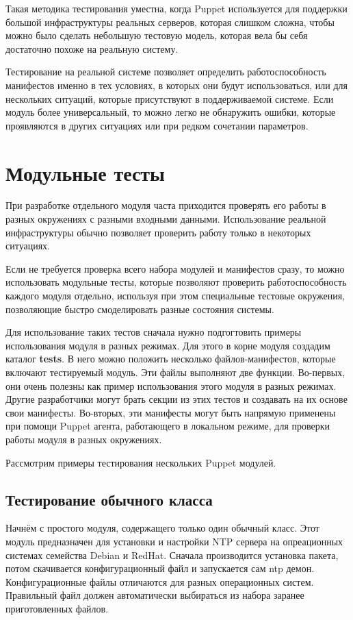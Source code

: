 Такая методика тестирования уместна, когда Puppet используется для поддержки большой инфраструктуры реальных серверов, которая слишком сложна, чтобы можно было сделать небольшую тестовую модель, которая вела бы себя достаточно похоже на реальную систему.

Тестирование на реальной системе позволяет определить работоспособность манифестов именно в тех условиях, в которых они будут использоваться, или для нескольких ситуаций, которые присутствуют в поддерживаемой системе. Если модуль более универсальный, то можно легко не обнаружить ошибки, которые проявляются в других ситуациях или при редком сочетании параметров.

\section{Модульные тесты}

При разработке отдельного модуля часта приходится проверять его работы в разных окружениях с разными входными данными. Использование реальной инфраструктуры обычно позволяет проверить работу только в некоторых ситуациях.

Если не требуется проверка всего набора модулей и манифестов сразу, то можно использовать модульные тесты, которые позволяют проверить работоспособность каждого модуля отдельно, используя при этом специальные тестовые окружения, позволяющие быстро смоделировать разные состояния системы.

Для использование таких тестов сначала нужно подгогтовить примеры использования модуля в разных режимах. Для этого в корне модуля создадим каталог \textbf{tests}. В него можно положить несколько файлов-манифестов, которые включают тестируемый модуль. Эти файлы выполняют две функции. Во-первых, они очень полезны как пример использования этого модуля в разных режимах. Другие разработчики могут брать секции из этих тестов и создавать на их основе свои манифесты. Во-вторых, эти манифесты могут быть напрямую применены при помощи Puppet агента, работающего в локальном режиме, для проверки работы модуля в разных окружениях.

Рассмотрим примеры тестирования нескольких Puppet модулей.

\subsection{Тестирование обычного класса}

Начнём с простого модуля, содержащего только один обычный класс. Этот модуль предназначен для установки и настройки NTP сервера на опреационных системах семейства Debian и RedHat. Сначала производится установка пакета, потом скачивается конфигурационный файл и запускается сам ntp демон. Конфигурационные файлы отличаются для разных операционных систем. Правильный файл должен автоматически выбираться из набора заранее приготовленных файлов.

